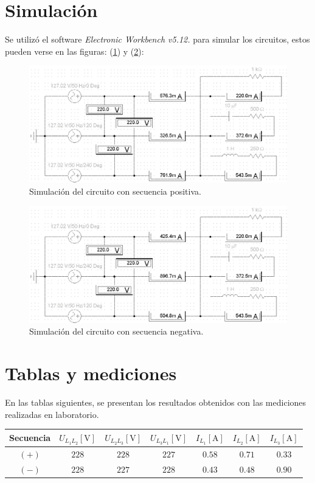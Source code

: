 \documentclass[letter,11pt]{article}
\begin{document}
\section{Simulación}
Se utilizó el software \emph{Electronic Workbench v5.12.} para simular
los circuitos, estos pueden verse en las figuras: (\ref{simulacion1}) y
(\ref{simulacion2}):

\begin{figure}[!h]
\centering
\includegraphics[scale=0.96]{simulacion/practica4.2.eps}
\caption{Simulación del circuito con secuencia positiva.}
\label{simulacion1}
\end{figure}

\begin{figure}[!h]
\centering
\includegraphics[scale=0.96]{simulacion/practica4.1.eps}
\caption{Simulación del circuito con secuencia negativa.}
\label{simulacion2}
\end{figure}

\section{Tablas y mediciones}
En las tablas siguientes, se presentan los resultados obtenidos con las
mediciones realizadas en laboratorio.

\begin{center}
    \begin{tabular}{|c||c|c|c||c|c|c|}
    \hline
    \textbf{Secuencia} &
    $U_{L_1L_2}[\text{V}]$ & $U_{L_2L_3}[\text{V}]$ & $U_{L_3L_1}[\text{V}]$ &
    $I_{L_1}[\text{A}]$ & $I_{L_2}[\text{A}]$ & $I_{L_3}[\text{A}]$
    \tabularnewline \hline \hline
    $(+)$ & $228$ & $228$ & $227$ & $0.58$ & $0.71$ & $0.33$
    \tabularnewline \hline
    $(-)$ & $228$ & $227$ & $228$ & $0.43$ & $0.48$ & $0.90$
    \tabularnewline \hline
    \end{tabular}
\end{center}
\end{document}
